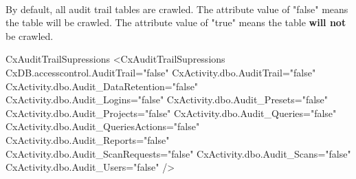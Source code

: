 \noindent\\By default, all audit trail tables are crawled.  The attribute value of "false" means the table will be crawled. The attribute
value of "true" means the table \textbf{will not} be crawled.\\

    
\begin{xml}{CxAuditTrailSupressions}{}{}
<CxAuditTrailSupressions
    CxDB.accesscontrol.AuditTrail="false"
    CxActivity.dbo.AuditTrail="false"
    CxActivity.dbo.Audit_DataRetention="false"
    CxActivity.dbo.Audit_Logins="false"
    CxActivity.dbo.Audit_Presets="false"
    CxActivity.dbo.Audit_Projects="false"
    CxActivity.dbo.Audit_Queries="false"
    CxActivity.dbo.Audit_QueriesActions="false"
    CxActivity.dbo.Audit_Reports="false"
    CxActivity.dbo.Audit_ScanRequests="false"
    CxActivity.dbo.Audit_Scans="false"
    CxActivity.dbo.Audit_Users="false"
    />
\end{xml}
